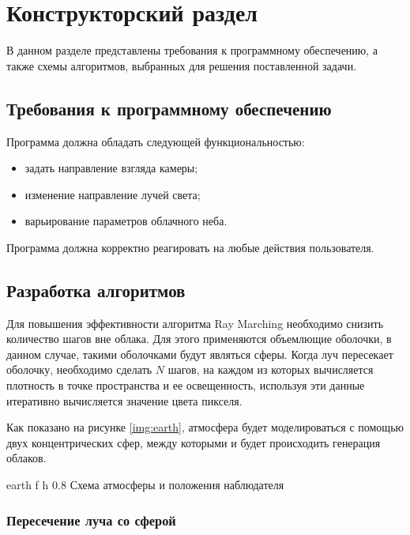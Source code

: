 \chapter{Конструкторский раздел}

В данном разделе представлены требования к программному обеспечению, а также схемы алгоритмов, выбранных для решения поставленной
задачи.

\section{Требования к программному обеспечению}
Программа должна обладать следующей функциональностью:
\begin{itemize}
	\item задать направление взгляда камеры;
	\item изменение направление лучей света;
	\item варьирование параметров облачного неба.
\end{itemize}

Программа должна корректно реагировать на любые действия пользователя.

\section{Разработка алгоритмов}

Для повышения эффективности алгоритма Ray Marching необходимо снизить количество шагов вне облака. 
Для этого применяются объемлющие оболочки, в данном случае, такими оболочками будут являться сферы.
Когда луч пересекает оболочку, необходимо сделать $ N $ шагов, на каждом из которых вычисляется плотность в точке пространства и ее освещенность, используя эти данные итеративно вычисляется значение цвета пикселя. 

Как показано на рисунке \ref{img:earth}, атмосфера будет моделироваться с помощью двух концентрических сфер, между которыми и будет происходить генерация облаков.

{earth} %
{f} %
{h} %
{0.8\textwidth} %
{Схема атмосферы и положения наблюдателя} %


\subsection{Пересечение луча со сферой}


